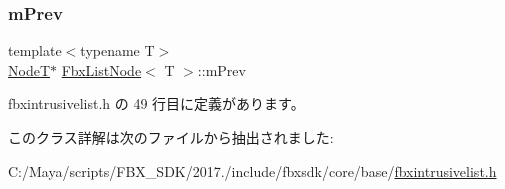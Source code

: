 \mbox{\label{class_fbx_list_node_ac384122a2dbb52a949646b26db8b59fc}} 
\subsubsection{\texorpdfstring{m\+Prev}{mPrev}}
{\footnotesize\ttfamily template$<$typename T$>$ \\
\hyperlink{class_fbx_list_node}{NodeT}$\ast$ \hyperlink{class_fbx_list_node}{Fbx\+List\+Node}$<$ T $>$\+::m\+Prev}



 fbxintrusivelist.\+h の 49 行目に定義があります。



このクラス詳解は次のファイルから抽出されました\+:\begin{DoxyCompactItemize}
\item 
C\+:/\+Maya/scripts/\+F\+B\+X\+\_\+\+S\+D\+K/2017./include/fbxsdk/core/base/\hyperlink{fbxintrusivelist_8h}{fbxintrusivelist.\+h}\end{DoxyCompactItemize}
